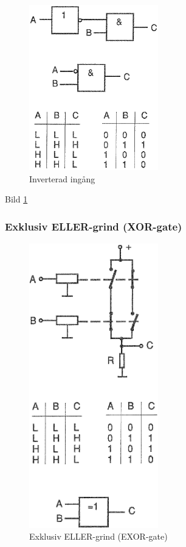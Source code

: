 \begin{figure}
\includegraphics[width=0.5\textwidth]{images/bild_2_2-41.png}
\caption{Inverterad ingång}
\label{fig:BildII2-41}
\end{figure}

Bild \ref{fig:BildII2-41}

\subsubsection{Exklusiv ELLER-grind (XOR-gate)}

\begin{figure}
\includegraphics[width=0.5\textwidth]{images/bild_2_2-42.png}
\caption{Exklusiv ELLER-grind (EXOR-gate)}
\label{fig:BildII2-42}
\end{figure}

